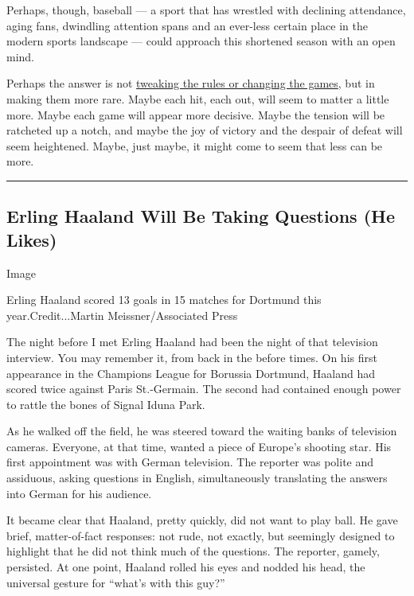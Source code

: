 Perhaps, though, baseball --- a sport that has wrestled with declining
attendance, aging fans, dwindling attention spans and an ever-less
certain place in the modern sports landscape --- could approach this
shortened season with an open mind.

Perhaps the answer is not
\href{https://www.nytimes3xbfgragh.onion/interactive/2020/07/21/sports/coronavirus-changes-baseball-nba-nfl.html}{tweaking
the rules or changing the games}, but in making them more rare. Maybe
each hit, each out, will seem to matter a little more. Maybe each game
will appear more decisive. Maybe the tension will be ratcheted up a
notch, and maybe the joy of victory and the despair of defeat will seem
heightened. Maybe, just maybe, it might come to seem that less can be
more.

\begin{center}\rule{0.5\linewidth}{\linethickness}\end{center}

\hypertarget{erling-haaland-will-be-taking-questions-he-likes}{%
\subsection{Erling Haaland Will Be Taking Questions (He
Likes)}\label{erling-haaland-will-be-taking-questions-he-likes}}

Image

Erling Haaland scored 13 goals in 15 matches for Dortmund this
year.Credit...Martin Meissner/Associated Press

The night before I met Erling Haaland had been the night of that
television interview. You may remember it, from back in the before
times. On his first appearance in the Champions League for Borussia
Dortmund, Haaland had scored twice against Paris St.-Germain. The second
had contained enough power to rattle the bones of Signal Iduna Park.

As he walked off the field, he was steered toward the waiting banks of
television cameras. Everyone, at that time, wanted a piece of Europe's
shooting star. His first appointment was with German television. The
reporter was polite and assiduous, asking questions in English,
simultaneously translating the answers into German for his audience.

It became clear that Haaland, pretty quickly, did not want to play ball.
He gave brief, matter-of-fact responses: not rude, not exactly, but
seemingly designed to highlight that he did not think much of the
questions. The reporter, gamely, persisted. At one point, Haaland rolled
his eyes and nodded his head, the universal gesture for ``what's with
this guy?''

